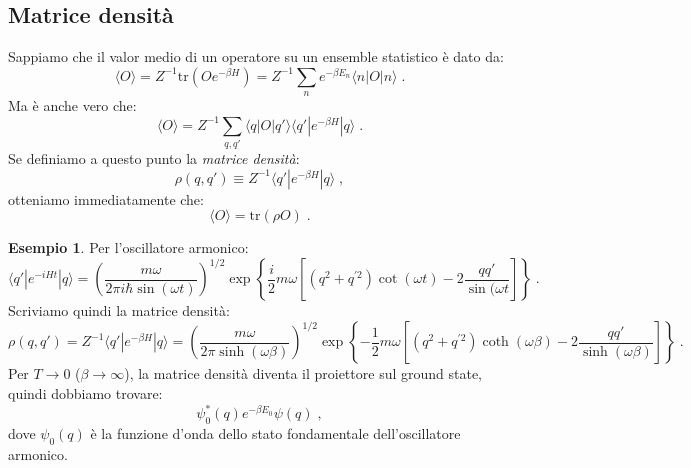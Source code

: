 \documentclass[12pt,a4paper]{article}
\theoremstyle{definition}
\newtheorem{exm}{Esempio}
\numberwithin{equation}{section}
\newcommand{\bra}{\langle}
\newcommand{\ket}{\rangle}
\newcommand{\tr}{\mathrm{tr}}
\begin{document}
\subsection{Matrice densità}
Sappiamo che il valor medio di un operatore su un ensemble statistico è dato da:
\begin{equation}
\bra O\ket=Z^{-1}\tr(Oe^{-\beta H})=Z^{-1}\sum_n e^{-\beta E_n}\bra n|O|n\ket\;.
\end{equation}
Ma è anche vero che:
\begin{equation}
\bra O \ket=Z^{-1}\sum_{q,q'}\bra q|O|q'\ket\bra q'|e^{-\beta H}|q\ket\;.
\end{equation}
Se definiamo a questo punto la \emph{matrice densità}:
\begin{equation}
\rho(q,q')\equiv Z^{-1}\bra q'|e^{-\beta H}|q\ket\;,
\end{equation}
otteniamo immediatamente che:
\begin{equation}
\bra O\ket=\tr(\rho O)\;.
\end{equation}
\begin{exm} 
Per l'oscillatore armonico:
$$
\bra q'|e^{-iHt}|q\ket=\left(\frac{m\omega}{2\pi i\hbar\sin(\omega t)}\right)^{1/2}\exp\left\{\frac{i}{2}m\omega\left[(q^2+q^{'2})\cot(\omega t)-2\frac{qq'}{\sin(\omega t}\right]\right\}\;.
$$
Scriviamo quindi la matrice densità:
$$
\rho(q,q')=Z^{-1}\bra q'|e^{-\beta H}|q\ket=\left(\frac{m\omega}{2\pi\sinh(\omega\beta)}\right)^{1/2}\exp\left\{-\frac{1}{2}m\omega\left[(q^2+q^{'2})\coth(\omega\beta)-2\frac{qq'}{\sinh(\omega\beta)}\right]\right\}\;.
$$
Per $T\to 0$ ($\beta\to\infty$), la matrice densità diventa il proiettore sul ground state, quindi dobbiamo trovare:
$$
\psi_0^*(q)e^{-\beta E_0}\psi(q)\;,
$$
dove $\psi_0(q)$ è la funzione d'onda dello stato fondamentale dell'oscillatore armonico.
\end{exm}
\end{document}
